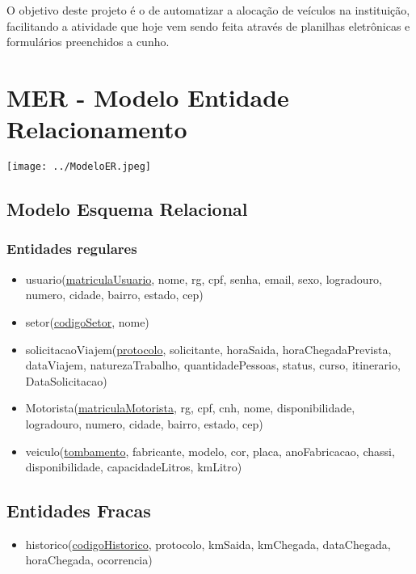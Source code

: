 \documentclass[11pt]{article}
\begin{document}
O objetivo deste projeto é o de automatizar a alocação de veículos na instituição, facilitando a atividade que hoje vem sendo feita através de planilhas eletrônicas e formulários preenchidos a cunho.

\section{MER - Modelo Entidade Relacionamento}

\begin{center}
\texttt{[image: ../ModeloER.jpeg]}
\end{center}   

\subsection{Modelo Esquema Relacional}

\subsubsection{Entidades regulares}
\begin{itemize}
\item usuario(\underline{matriculaUsuario}, nome, rg, cpf, senha,
email, sexo, logradouro, numero, cidade, bairro, estado, cep)

\item setor(\underline{codigoSetor}, nome)

\item solicitacaoViajem(\underline{protocolo}, solicitante, horaSaida, horaChegadaPrevista, dataViajem, naturezaTrabalho, quantidadePessoas, status, curso, itinerario, DataSolicitacao)

\item Motorista(\underline{matriculaMotorista}, rg, cpf, cnh, nome, disponibilidade, logradouro, numero, cidade, bairro, estado, cep)

\item veiculo(\underline{tombamento}, fabricante, modelo, cor, placa, anoFabricacao, chassi, disponibilidade, capacidadeLitros, kmLitro)
\end{itemize}

\subsection{Entidades Fracas}
\begin{itemize}

\item historico(\underline{codigoHistorico}, protocolo, kmSaida, kmChegada, dataChegada, horaChegada, ocorrencia)

\end{itemize}
\end{document}
